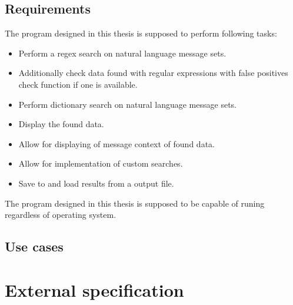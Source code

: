 \documentclass[a4paper,twoside,12pt]{book}
\begin{document}
\section{Requirements}

The program designed in this thesis is supposed to perform following tasks:
\begin{itemize}
   \item Perform a regex search on natural language message sets.
   \item Additionally check data found with regular expressions with false positives check function if one is available.
   \item Perform dictionary search on natural language message sets.
   \item Display the found data.
   \item Allow for displaying of message context of found data.
   \item Allow for implementation of custom searches.
   \item Save to and load results from a output file.
\end{itemize}

The program designed in this thesis is supposed to be capable of runing regardless of operating system.

\section{Use cases}


\chapter{External specification}
\end{document}
